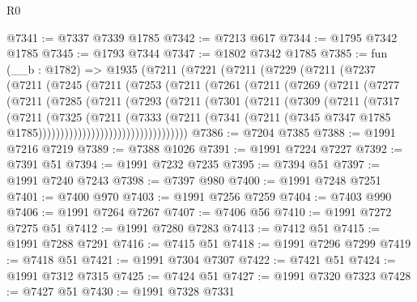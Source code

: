 \begin{lexlean}{R0}
\begin{coremodule}
@7341 := @7337 @7339 @1785
@7342 := @7213 @617
@7344 := @1795 @7342 @1785
@7345 := @1793 @7344
@7347 := @1802 @7342 @1785
@7385 := fun (__b : @1782) =>
  @1935
    (@7211
      (@7221
        (@7211
          (@7229
            (@7211
              (@7237
                (@7211
                  (@7245
                    (@7211
                      (@7253
                        (@7211
                          (@7261
                            (@7211
                              (@7269
                                (@7211
                                  (@7277
                                    (@7211
                                      (@7285
                                        (@7211
                                          (@7293
                                            (@7211
                                              (@7301
                                                (@7211
                                                  (@7309
                                                    (@7211
                                                      (@7317
                                                        (@7211
                                                          (@7325
                                                            (@7211
                                                              (@7333
                                                                (@7211
                                                                  (@7341
                                                                    (@7211
                                                                      (@7345
                                                                        @7347
                                                                        @1785
                                                                        @1785))))))))))))))))))))))))))))))))))
@7386 := @7204 @7385
@7388 := @1991 @7216 @7219
@7389 := @7388 @1026
@7391 := @1991 @7224 @7227
@7392 := @7391 @51
@7394 := @1991 @7232 @7235
@7395 := @7394 @51
@7397 := @1991 @7240 @7243
@7398 := @7397 @980
@7400 := @1991 @7248 @7251
@7401 := @7400 @970
@7403 := @1991 @7256 @7259
@7404 := @7403 @990
@7406 := @1991 @7264 @7267
@7407 := @7406 @56
@7410 := @1991 @7272 @7275 @51
@7412 := @1991 @7280 @7283
@7413 := @7412 @51
@7415 := @1991 @7288 @7291
@7416 := @7415 @51
@7418 := @1991 @7296 @7299
@7419 := @7418 @51
@7421 := @1991 @7304 @7307
@7422 := @7421 @51
@7424 := @1991 @7312 @7315
@7425 := @7424 @51
@7427 := @1991 @7320 @7323
@7428 := @7427 @51
@7430 := @1991 @7328 @7331

\end{coremodule}
\end{lexlean}
